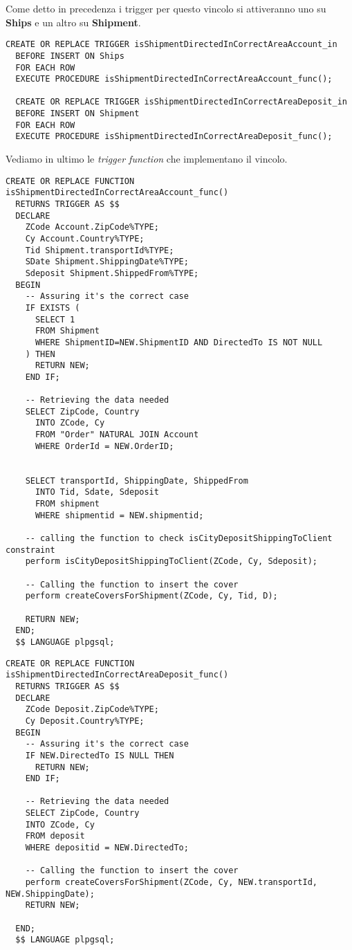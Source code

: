 Come detto in precedenza i trigger per questo vincolo si attiveranno uno su \textbf{Ships} e un altro su \textbf{Shipment}.

\begin{lstlisting}[caption={Trigger per il vincolo \textbf{isShipmentDirectedInCorrectArea}}]
  CREATE OR REPLACE TRIGGER isShipmentDirectedInCorrectAreaAccount_in
  BEFORE INSERT ON Ships
  FOR EACH ROW 
  EXECUTE PROCEDURE isShipmentDirectedInCorrectAreaAccount_func();
  
  CREATE OR REPLACE TRIGGER isShipmentDirectedInCorrectAreaDeposit_in
  BEFORE INSERT ON Shipment 
  FOR EACH ROW 
  EXECUTE PROCEDURE isShipmentDirectedInCorrectAreaDeposit_func();
\end{lstlisting}

\newpage
Vediamo in ultimo le \textit{trigger function} che implementano il vincolo.

\begin{lstlisting}[caption={Funzione per le spedizioni verso clienti}]
  CREATE OR REPLACE FUNCTION isShipmentDirectedInCorrectAreaAccount_func() 
  RETURNS TRIGGER AS $$
  DECLARE 
    ZCode Account.ZipCode%TYPE;
    Cy Account.Country%TYPE;
    Tid Shipment.transportId%TYPE;
    SDate Shipment.ShippingDate%TYPE;
    Sdeposit Shipment.ShippedFrom%TYPE;
  BEGIN 
    -- Assuring it's the correct case
    IF EXISTS (
      SELECT 1
      FROM Shipment
      WHERE ShipmentID=NEW.ShipmentID AND DirectedTo IS NOT NULL
    ) THEN
      RETURN NEW;
    END IF;
  
    -- Retrieving the data needed
    SELECT ZipCode, Country 
      INTO ZCode, Cy
      FROM "Order" NATURAL JOIN Account
      WHERE OrderId = NEW.OrderID;

      
    SELECT transportId, ShippingDate, ShippedFrom
      INTO Tid, Sdate, Sdeposit
      FROM shipment
      WHERE shipmentid = NEW.shipmentid;
        
    -- calling the function to check isCityDepositShippingToClient constraint
    perform isCityDepositShippingToClient(ZCode, Cy, Sdeposit);

    -- Calling the function to insert the cover
    perform createCoversForShipment(ZCode, Cy, Tid, D);

    RETURN NEW;
  END;
  $$ LANGUAGE plpgsql;
\end{lstlisting}

\newpage
\begin{lstlisting}[caption={Funzione per le spedizioni verso depositi}]
  CREATE OR REPLACE FUNCTION isShipmentDirectedInCorrectAreaDeposit_func() 
  RETURNS TRIGGER AS $$
  DECLARE 
    ZCode Deposit.ZipCode%TYPE;
    Cy Deposit.Country%TYPE;
  BEGIN 
    -- Assuring it's the correct case
    IF NEW.DirectedTo IS NULL THEN 
      RETURN NEW;
    END IF;

    -- Retrieving the data needed
    SELECT ZipCode, Country 
    INTO ZCode, Cy
    FROM deposit
    WHERE depositid = NEW.DirectedTo;

    -- Calling the function to insert the cover
    perform createCoversForShipment(ZCode, Cy, NEW.transportId, NEW.ShippingDate);
    RETURN NEW;

  END;
  $$ LANGUAGE plpgsql;
\end{lstlisting}


